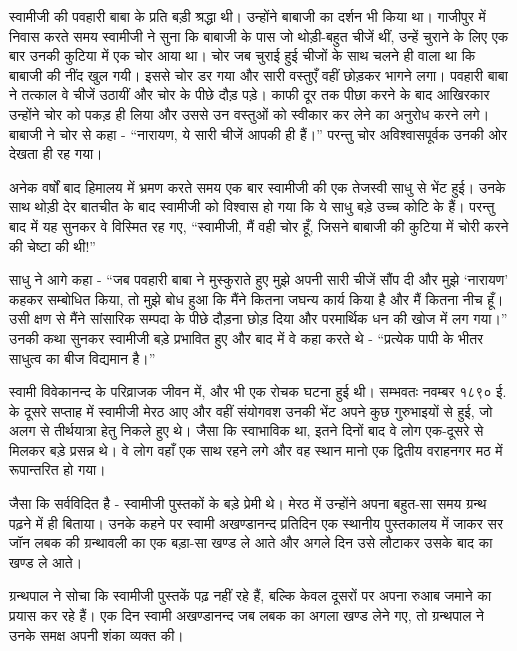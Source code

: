 \vskip -8pt

\delimiter

स्वामीजी की पवहारी बाबा के प्रति बड़ी श्रद्धा थी। उन्होंने बाबाजी का दर्शन भी किया था। गाजीपुर में निवास करते समय स्वामीजी ने सुना कि बाबाजी के पास जो थोड़ी-बहुत चीजें थीं, उन्हें चुराने के लिए एक बार उनकी कुटिया में एक चोर आया था। चोर जब चुराई हुई चीजों के साथ चलने ही वाला था कि बाबाजी की नींद खुल गयी। इससे चोर डर गया और सारी वस्तुएँ वहीं छोड़कर भागने लगा। पवहारी बाबा ने तत्काल वे चीजें उठायीं और चोर के पीछे दौड़ पड़े। काफी दूर तक पीछा करने के बाद आखिरकार उन्होंने चोर को पकड़ ही लिया और उससे उन वस्तुओं को स्वीकार कर लेने का अनुरोध करने लगे। बाबाजी ने चोर से कहा - “नारायण, ये सारी चीजें आपकी ही हैं।” परन्तु चोर अविश्वासपूर्वक उनकी ओर देखता ही रह गया। 

अनेक वर्षों बाद हिमालय में भ्रमण करते समय एक बार स्वामीजी की एक तेजस्वी साधु से भेंट हुई। उनके साथ थोड़ी देर बातचीत के बाद स्वामीजी को विश्वास हो गया कि ये साधु बड़े उच्च कोटि के हैं। परन्तु बाद में यह सुनकर वे विस्मित रह गए, “स्वामीजी, मैं वही चोर हूँ, जिसने बाबाजी की कुटिया में चोरी करने की चेष्टा की थी!” 

साधु ने आगे कहा - “जब पवहारी बाबा ने मुस्कुराते हुए मुझे अपनी सारी चीजें सौंप दी और मुझे ‘नारायण’ कहकर सम्बोधित किया, तो मुझे बोध हुआ कि मैंने कितना जघन्य कार्य किया है और मैं कितना नीच हूँ। उसी क्षण से मैंने सांसारिक सम्पदा के पीछे दौड़ना छोड़ दिया और परमार्थिक धन की खोज में लग गया।” उनकी कथा सुनकर स्वामीजी बड़े प्रभावित हुए और बाद में वे कहा करते थे - “प्रत्येक पापी के भीतर साधुत्व का बीज विद्यमान है।” 

\vskip -8pt

\delimiter

स्वामी विवेकानन्द के परिव्राजक जीवन में, और भी एक रोचक घटना हुई थी। सम्भवतः नवम्बर १८९० ई. के दूसरे सप्ताह में स्वामीजी मेरठ आए और वहीं संयोगवश उनकी भेंट अपने कुछ गुरुभाइयों से हुई, जो अलग से तीर्थयात्रा हेतु निकले हुए थे। जैसा कि स्वाभाविक था, इतने दिनों बाद वे लोग एक-दूसरे से मिलकर बड़े प्रसन्न थे। वे लोग वहाँ एक साथ रहने लगे और वह स्थान मानो एक द्वितीय वराहनगर मठ में रूपान्तरित हो गया। 

जैसा कि सर्वविदित है - स्वामीजी पुस्तकों के बड़े प्रेमी थे। मेरठ में उन्होंने अपना बहुत-सा समय ग्रन्थ पढ़ने में ही बिताया। उनके कहने पर स्वामी अखण्डानन्द प्रतिदिन एक स्थानीय पुस्तकालय में जाकर सर जॉन लबक की ग्रन्थावली का एक बड़ा-सा खण्ड ले आते और अगले दिन उसे लौटाकर उसके बाद का खण्ड ले आते। 

ग्रन्थपाल ने सोचा कि स्वामीजी पुस्तकें पढ़ नहीं रहे हैं, बल्कि केवल दूसरों पर अपना रुआब जमाने का प्रयास कर रहे हैं। एक दिन स्वामी अखण्डानन्द जब लबक का अगला खण्ड लेने गए, तो ग्रन्थपाल ने उनके समक्ष अपनी शंका व्यक्त की। 

